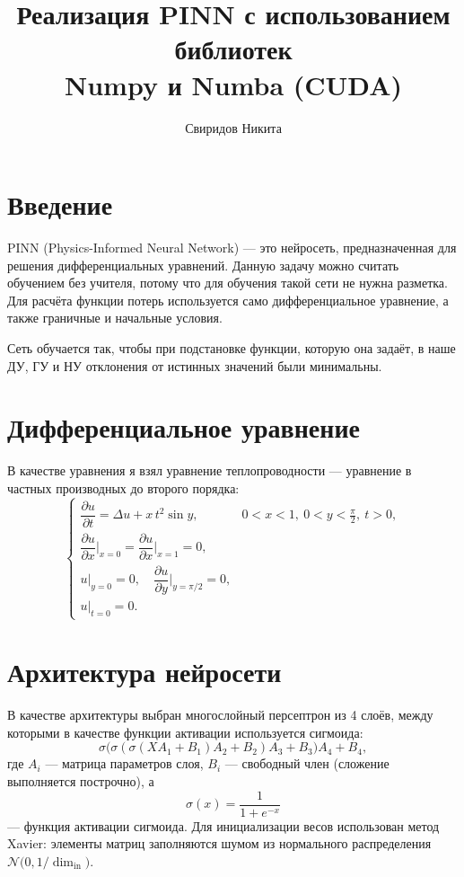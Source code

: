 \documentclass[12pt,a4paper]{article}
\title{\textbf{Реализация PINN с использованием библиотек\\ Numpy и Numba (CUDA)}}
\author{Свиридов Никита}
\date{}
\begin{document}
\maketitle

\section{Введение}

PINN (Physics-Informed Neural Network) --- это нейросеть, предназначенная для
решения дифференциальных уравнений. Данную задачу можно считать обучением без
учителя, потому что для обучения такой сети не нужна разметка. Для расчёта
функции потерь используется само дифференциальное уравнение, а также граничные
и начальные условия.

Сеть обучается так, чтобы при подстановке функции, которую она задаёт, в наше
ДУ, ГУ и НУ отклонения от истинных значений были минимальны.

\section{Дифференциальное уравнение}

В качестве уравнения я взял уравнение теплопроводности --- уравнение в частных
производных до второго порядка:
\begin{equation*}
\begin{cases}
\dfrac{\partial u}{\partial t} = \Delta u + x\,t^2 \sin y, & 0 < x < 1,\ 0 < y < \tfrac{\pi}{2},\ t > 0,\\[2mm]
\dfrac{\partial u}{\partial x}\Big|_{x=0} = \dfrac{\partial u}{\partial x}\Big|_{x=1} = 0, & \\[2mm]
u\big|_{y=0} = 0, \quad \dfrac{\partial u}{\partial y}\Big|_{y=\pi/2} = 0, & \\[2mm]
u\big|_{t=0} = 0. &
\end{cases}
\end{equation*}

\section{Архитектура нейросети}

В качестве архитектуры выбран многослойный персептрон из 4 слоёв, между которыми
в качестве функции активации используется сигмоида:
\[
\sigma\!\big(\sigma(\sigma(X A_1 + B_1)A_2 + B_2)A_3 + B_3\big)A_4 + B_4,
\]
где $A_i$ --- матрица параметров слоя, $B_i$ --- свободный член (сложение
выполняется построчно), а
\[
\sigma(x) = \frac{1}{1 + e^{-x}}
\]
--- функция активации сигмоида. Для инициализации весов использован метод
Xavier: элементы матриц заполняются шумом из нормального распределения
$\mathcal{N}\!\big(0, 1/\dim_{\text{in}}\big)$.
\end{document}
